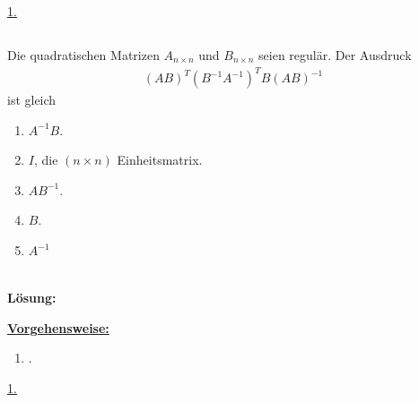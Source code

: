 \underline{1. }\\
 

\newpage

\subsection*{}
Die quadratischen Matrizen $ A_{n \times n} $ und $ B_{n \times n} $ seien regulär.
Der Ausdruck
\begin{align*}
	(A B)^T(B^{-1} A^{-1})^T B (AB)^{-1}
\end{align*}
ist gleich
\renewcommand{\labelenumi}{(\alph{enumi})}
\begin{enumerate}
	\item 
	$ A^{-1} B $.
	\item 
	$ I $, die $ (n \times n) $ Einheitsmatrix.
	\item
	$ AB^{-1} $.
	\item
	$ B $.
	\item 
	$ A^{-1} $
\end{enumerate}
\ \\
\textbf{Lösung:}
\begin{mdframed}
\underline{\textbf{Vorgehensweise:}}
\renewcommand{\labelenumi}{\theenumi.}
\begin{enumerate}
\item .
\end{enumerate}
\end{mdframed}

\underline{1. }\\


\newpage
